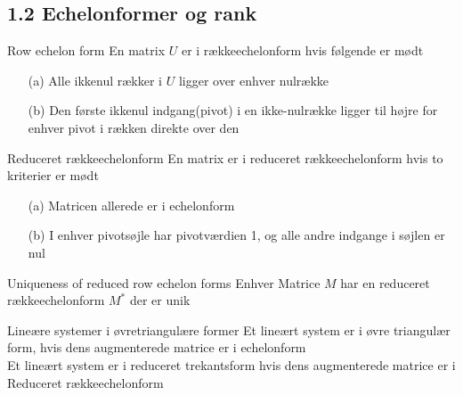 \documentclass[a4paper,fleqn]{article}
\begin{document}
	\subsection{1.2 Echelonformer og rank}
	\begin{definition}{Row echelon form}{}
		En matrix $U$ er i rækkeechelonform hvis følgende er mødt
		\begin{itemize}
			\item[(a)] Alle ikkenul rækker i $U$ ligger over enhver nulrække
			\item[(b)] Den første ikkenul indgang(pivot) i en ikke-nulrække ligger til højre for enhver
				pivot i rækken direkte over den
		\end{itemize}
	\end{definition}
	\begin{definition}{Reduceret rækkeechelonform}{}
		En matrix er i reduceret rækkeechelonform hvis to kriterier er mødt
		\begin{itemize}
			\item[(a)] Matricen allerede er i echelonform
			\item[(b)] I enhver pivotsøjle har pivotværdien 1, og alle andre indgange
				i søjlen er nul
		\end{itemize}
	\end{definition}
	\begin{theorem}{Uniqueness of reduced row echelon forms}{}
		Enhver Matrice $M$ har en reduceret rækkeechelonform $M^*$ der er unik
	\end{theorem}
	\begin{definition}{Lineære systemer i øvretriangulære former}{}
		Et lineært system er i øvre triangulær form, hvis dens augmenterede matrice
		er i echelonform\\
		Et lineært system er i reduceret trekantsform hvis dens augmenterede matrice er
		i Reduceret rækkeechelonform
	\end{definition}
\end{document}
